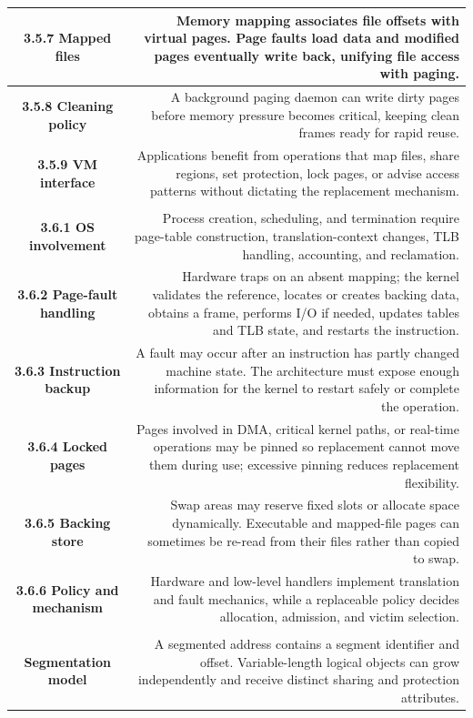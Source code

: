 \documentclass[10pt,letterpaper]{article}
\begin{document}
\begin{longtable}{C N}
\textbf{3.5.7 Mapped files} & Memory mapping associates file offsets with virtual pages. Page faults load data and modified pages eventually write back, unifying file access with paging.\\\hline
\textbf{3.5.8 Cleaning policy} & A background paging daemon can write dirty pages before memory pressure becomes critical, keeping clean frames ready for rapid reuse.\\\hline
\textbf{3.5.9 VM interface} & Applications benefit from operations that map files, share regions, set protection, lock pages, or advise access patterns without dictating the replacement mechanism.\\\hline
{}\\*\hline
\textbf{3.6.1 OS involvement} & Process creation, scheduling, and termination require page-table construction, translation-context changes, TLB handling, accounting, and reclamation.\\\hline
\textbf{3.6.2 Page-fault handling} & Hardware traps on an absent mapping; the kernel validates the reference, locates or creates backing data, obtains a frame, performs I/O if needed, updates tables and TLB state, and restarts the instruction.\\\hline
\textbf{3.6.3 Instruction backup} & A fault may occur after an instruction has partly changed machine state. The architecture must expose enough information for the kernel to restart safely or complete the operation.\\\hline
\textbf{3.6.4 Locked pages} & Pages involved in DMA, critical kernel paths, or real-time operations may be pinned so replacement cannot move them during use; excessive pinning reduces replacement flexibility.\\\hline
\textbf{3.6.5 Backing store} & Swap areas may reserve fixed slots or allocate space dynamically. Executable and mapped-file pages can sometimes be re-read from their files rather than copied to swap.\\\hline
\textbf{3.6.6 Policy and mechanism} & Hardware and low-level handlers implement translation and fault mechanics, while a replaceable policy decides allocation, admission, and victim selection.\\\hline
{}\\*\hline
\textbf{Segmentation model} & A segmented address contains a segment identifier and offset. Variable-length logical objects can grow independently and receive distinct sharing and protection attributes.\\\hline

\end{longtable}
\end{document}
